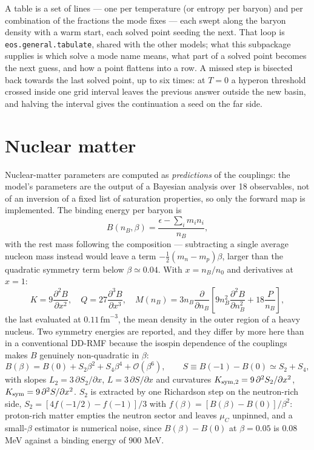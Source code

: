 \documentclass[aps,prc,onecolumn,superscriptaddress,nofootinbib,10pt]{revtex4-2}
\newcommand{\nB}{n_B}
\newcommand{\nzero}{n_0}
\newcommand{\muC}{\mu_C}
\begin{document}
A table is a set of lines --- one per temperature (or entropy per baryon) and
per combination of the fractions the mode fixes --- each swept along the baryon
density with a warm start, each solved point seeding the next. That loop is
\texttt{eos.general.tabulate}, shared with the other models; what this
subpackage supplies is which solve a mode name means, what part of a solved
point becomes the next guess, and how a point flattens into a row. A missed
step is bisected back towards the last solved point, up to six times: at
$T = 0$ a hyperon threshold crossed inside one grid interval leaves the
previous answer outside the new basin, and halving the interval gives the
continuation a seed on the far side.

\section{Nuclear matter}
\label{sec:nmp}

Nuclear-matter parameters are computed as \emph{predictions} of the couplings:
the model's parameters are the output of a Bayesian analysis over 18
observables, not of an inversion of a fixed list of saturation properties, so
only the forward map is implemented. The binding energy per baryon is
\begin{equation}
  B(\nB, \beta) = \frac{\epsilon - \sum_i m_i n_i}{\nB} ,
\end{equation}
with the rest mass following the composition --- subtracting a single average
nucleon mass instead would leave a term $-\tfrac{1}{2}(m_n - m_p)\beta$, larger
than the quadratic symmetry term below $\beta \simeq 0.04$. With
$x = \nB/\nzero$ and derivatives at $x = 1$:
\begin{equation}
  K = 9\frac{\partial^2 B}{\partial x^2} , \quad
  Q = 27\frac{\partial^3 B}{\partial x^3} , \quad
  M(\nB) = 3\nB \frac{\partial}{\partial \nB}
           \left[ 9\nB^2 \frac{\partial^2 B}{\partial \nB^2}
                  + 18\frac{P}{\nB} \right] ,
\end{equation}
the last evaluated at $0.11\,\mathrm{fm}^{-3}$, the mean density in the outer
region of a heavy nucleus. Two symmetry energies are reported, and they differ
by more here than in a conventional DD-RMF because the isospin dependence of
the couplings makes $B$ genuinely non-quadratic in $\beta$:
\begin{equation}
  B(\beta) = B(0) + S_2 \beta^2 + S_4 \beta^4 + \mathcal{O}(\beta^6) ,
  \qquad
  S \equiv B(-1) - B(0) \simeq S_2 + S_4 ,
\end{equation}
with slopes $L_2 = 3\,\partial S_2/\partial x$, $L = 3\,\partial S/\partial x$
and curvatures $K_{\rm sym,2} = 9\,\partial^2 S_2/\partial x^2$,
$K_{\rm sym} = 9\,\partial^2 S/\partial x^2$. $S_2$ is extracted by one
Richardson step on the neutron-rich side, $S_2 = [4f(-1/2) - f(-1)]/3$ with
$f(\beta) = [B(\beta)-B(0)]/\beta^2$: proton-rich matter empties the neutron
sector and leaves $\muC$ unpinned, and a small-$\beta$ estimator is numerical
noise, since $B(\beta) - B(0)$ at $\beta = 0.05$ is $0.08$ MeV against a
binding energy of $900$ MeV.
\end{document}
